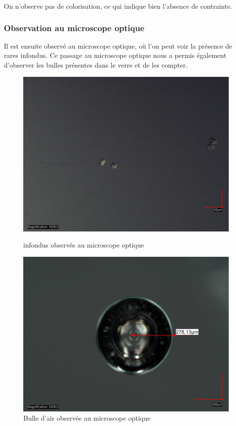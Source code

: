 \documentclass{article}
\begin{document}
On n'observe pas de colorisation, ce qui indique bien l'absence de contrainte.

\subsubsection{Observation au microscope optique}

Il est ensuite observé au microscope optique, où l'on peut voir la présence de rares infondus. Ce passage au microscope optique nous a permis également d'observer les bulles présentes dans le verre et de les compter.

\begin{figure}[ht]
    \centering
    \begin{minipage}{0.45\textwidth}
        \centering
        \includegraphics[width=\textwidth]{photos/impuetée2.jpg}
        \caption{infondus observés au microscope optique}
    \end{minipage}
    \hspace{0.5cm}
    \begin{minipage}{0.45\textwidth}
        \centering
        \includegraphics[width=\textwidth]{photos/rayon 1 modified.jpg}
        \caption{Bulle d'air observée au microscope optique}
    \end{minipage}
\end{figure}
\end{document}
